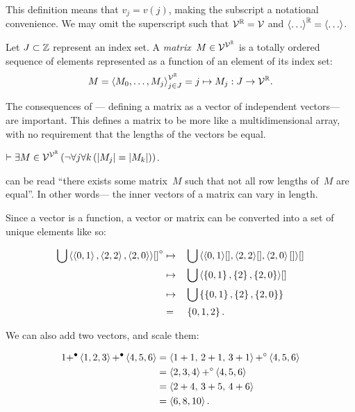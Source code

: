 This definition means that $v_j = v(j)$,
  making the subscript a notational convenience.
We may omit the superscript such that $\mathcal{V}^{\mathbb{R}}=\mathcal{V}$
  and $\left\langle\ldots\right\rangle^{\mathbb{R}}=\left\langle\ldots\right\rangle$.

\begin{definition}[Matrix]
  Let $J\subset\mathbb{Z}$ represent an index set.
  A \emph{matrix}~$M\in\mathcal{V}^{\mathcal{V}^{\mathbb{R}}}$ is a totally ordered sequence of
   elements represented as a function of an element of its index set:
  \begin{equation}
    M = \left\langle M_0,\ldots,M_j\right\rangle^{\mathcal{V}^{\mathbb{R}}}_{j\in J}
      = j \mapsto M_j : J \rightarrow \mathcal{V}^{\mathbb{R}}.
  \end{equation}
\end{definition}

The consequences of ---%
  defining a matrix as a vector of independent vectors---%
  are important.
This defines a matrix to be more like a multidimensional array,
  with no requirement that the lengths of the vectors be equal.

\begin{corollary}
  $\infer \Exists{M\in\Matrices}{\neg\Forall*{j}{\Forall{k}{\len{M_j} = \len{M_k}}}}$.
\end{corollary}

 can be read ``there exists some matrix~$M$ such that
  not all row lengths of~$M$ are equal''.
In other words---%
  the inner vectors of a matrix can vary in length.

Since a vector is a function,
  a vector or matrix can be converted into a set of unique elements like so:

\begin{alignat*}{2}
  \bigcup\left\langle\left\langle0,1\right\rangle,\left\langle2,2\right\rangle,\left\langle2,0\right\rangle\right\rangle\!{[]}^\circ
    &\mapsto &&\bigcup\left\langle\left\langle0,1\right\rangle\![],\left\langle2,2\right\rangle\![],\left\langle2,0\right\rangle[]\right\rangle\![] \\
    &\mapsto &&\bigcup\left\langle\left\{0,1\right\},\left\{2\right\},\left\{2,0\right\}\right\rangle\![] \\
    &\mapsto &&\bigcup\left\{\left\{0,1\right\},\left\{2\right\},\left\{2,0\right\}\right\} \\
    &=       &&\left\{0,1,2\right\}.
\end{alignat*}

We can also add two vectors, and scale them:

\begin{align*}
  1 {+}^\bullet \left\langle1,2,3\right\rangle {+}^\bullet \left\langle4,5,6\right\rangle
    &= \left\langle1+1,\, 2+1,\, 3+1\right\rangle {+}^\circ \left\langle4,5,6\right\rangle \\
    &= \left\langle2,3,4\right\rangle {+}^\circ \left\langle4,5,6\right\rangle \\
    &= \left\langle2+4,\, 3+5,\, 4+6\right\rangle \\
    &= \left\langle6, 8, 10\right\rangle.
\end{align*}


